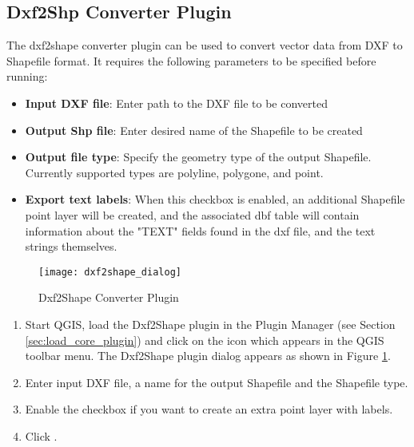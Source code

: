 
\subsection{Dxf2Shp Converter Plugin}


The dxf2shape converter plugin can be used to convert vector data from DXF to Shapefile 
format. It requires the following parameters to be specified before running:

\begin{itemize}
\item \textbf{Input DXF file}: Enter path to the DXF file to be converted
\item \textbf{Output Shp file}: Enter desired name of the Shapefile to be created
\item \textbf{Output file type}: Specify the geometry type of the output Shapefile. 
Currently supported types are polyline, polygone, and point.
\item \textbf{Export text labels}: When this checkbox is enabled, an additional Shapefile point layer will be created, and the associated dbf table will contain information about the "TEXT" fields found in the dxf file, and the text strings themselves.
\end{itemize}

\begin{figure}[ht]
   \begin{center}
   \caption{Dxf2Shape Converter Plugin \nixcaption}\label{fig:dxf2shape_dialog}\smallskip
   \texttt{[image: dxf2shape\_dialog]}
\end{center}  
\end{figure}


\begin{enumerate}
  \item Start QGIS, load the Dxf2Shape plugin in the Plugin Manager (see Section 
  \ref{sec:load_core_plugin}) and click on the  
  icon which appears in the QGIS toolbar menu. The Dxf2Shape plugin dialog appears as shown in Figure \ref{fig:dxf2shape_dialog}.
  \item Enter input DXF file, a name for the output Shapefile and the Shapefile type.
  \item Enable the  checkbox if you want to create an extra point layer with labels.
  \item Click . 
\end{enumerate}

\newpage
